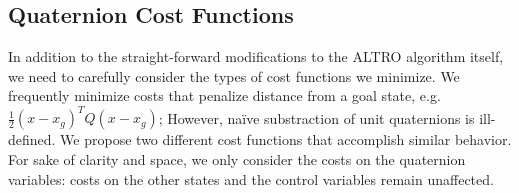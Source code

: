 \documentclass[letterpaper, 10 pt, conference]{ieeeconf}  %
\newcommand{\half}{\frac{1}{2}}
\begin{document}
    \subsection{Quaternion Cost Functions} \label{sec:cost_functions}
        In addition to the straight-forward modifications to the ALTRO algorithm itself, we
        need to carefully consider the types of cost functions we minimize. We frequently
        minimize costs that penalize distance from a goal state, e.g. $\half (x-x_g)^T Q
        (x-x_g)$; However, na\"ive substraction of unit quaternions is ill-defined. We
        propose two different cost functions that accomplish similar behavior.
        For sake of clarity and space, we only consider the costs on the quaternion
        variables: costs on the other states and the control variables remain unaffected.
        
\end{document}
